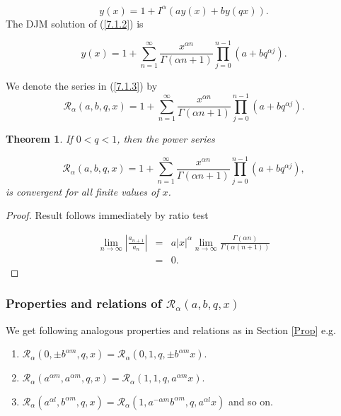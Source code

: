 \documentclass[12pt]{article}
\newtheorem{The}{Theorem}[section]
\numberwithin{equation}{section}
\begin{document}
\begin{equation}
y(x) = 1 + I^\alpha (ay(x)+ by(q x)). \label{7.1.2}
\end{equation}
The DJM solution of (\ref{7.1.2}) is

\begin{equation}
y(x) = 1 + \sum_{n=1}^\infty \frac{x^{\alpha n}}{\Gamma{(\alpha n + 1)}}\prod_{j=0}^{n-1}\left(a+bq^{\alpha j}\right).\label{7.1.3}
\end{equation}

We denote the series in (\ref{7.1.3}) by
\begin{equation}
\mathcal{R}_\alpha(a, b, q, x) =1 + \sum_{n=1}^\infty \frac{x^{\alpha n}}{\Gamma{(\alpha n + 1)}}\prod_{j=0}^{n-1}\left(a+bq^{\alpha j}\right).
\end{equation}

\begin{The}
If $0<q<1$, then the power series 

\begin{equation}
\mathcal{R}_\alpha(a, b, q, x) =1 + \sum_{n=1}^\infty \frac{x^{\alpha n}}{\Gamma{(\alpha n + 1)}}\prod_{j=0}^{n-1}\left(a+bq^{\alpha j}\right),\label{7.1.4}
\end{equation}
 is convergent for all finite values of $x$.

\end{The}

\begin{proof} Result follows immediately by ratio test 
 
\begin{eqnarray*}
\lim_{n\to\infty}\left| \frac{a_{n+1}}{a_n}\right| &=& a \left|x\right|^\alpha \lim_{n\to\infty}\frac {\Gamma(\alpha n)}{\Gamma{(\alpha (n + 1))}}\\
&=& 0.
\end{eqnarray*}

\end{proof}

\subsubsection{Properties and relations of $\mathcal{R}_\alpha(a,b,q,x)$}
\par We get following analogous properties and relations as in Section \ref{Prop} e.g. 

\begin{enumerate}
\item $\mathcal{R}_\alpha\left(0,\pm b^{\alpha m},q,x\right) =  \mathcal{R}_\alpha\left(0,1,q,\pm b^{\alpha m}x\right)$.
\item $\mathcal{R}_\alpha\left(a^{\alpha m}, a^{\alpha m},q,x\right) =  \mathcal{R}_\alpha\left(1,1,q,a^{\alpha m}x\right)$.
\item $\mathcal{R}_\alpha\left(a^{\alpha l}, b^{\alpha m}, q, x\right) =  \mathcal{R}_\alpha\left(1, a^{-{\alpha m}} b^{\alpha m},q,a^{\alpha l}x\right)$ and so on.
\end{enumerate}
\end{document}
